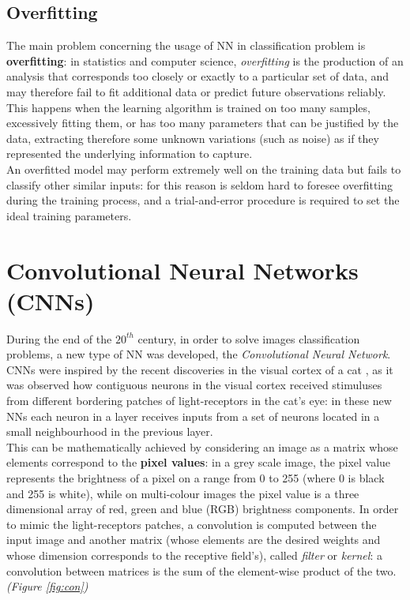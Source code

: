 \documentclass[../main.tex]{subfiles}
\begin{document}
\subsection{Overfitting}
The main problem concerning the usage of NN in classification problem is \textbf{overfitting}: in statistics and computer science, \textit{overfitting} is the production of an analysis that corresponds too closely or exactly to a particular set of data, and may therefore fail to fit additional data or predict future observations reliably.  \\ 
This happens when the learning algorithm is trained on too many samples, excessively fitting them, or has too many parameters that can be justified by the data, extracting therefore some unknown variations (such as noise) as if they represented the underlying information to capture. \\
An overfitted model may perform extremely well on the training data but fails to classify other similar inputs: for this reason is seldom hard to foresee overfitting during the training process, and a trial-and-error procedure is required to set the ideal training parameters.  

\vspace{5mm}
\section{Convolutional Neural Networks (CNNs)}
During the end of the $20^{th}$ century, in order to solve images classification problems, a new type of NN was developed, the \textit{Convolutional Neural Network}. \\
CNNs were inspired by the recent discoveries in the visual cortex of a cat \cite{Hubel1962}, as it was observed how contiguous neurons in the visual cortex received stimuluses from different bordering patches of light-receptors in the cat's eye: in these new NNs each neuron in a layer receives inputs from a set of neurons located in a small neighbourhood in the previous layer.  \\
This can be mathematically achieved by considering an image as a matrix whose elements correspond to the \textbf{pixel values}: in a grey scale image, the pixel value represents the brightness of a pixel on a range from 0 to 255 (where 0 is black and 255 is white), while on multi-colour images the pixel value is a three dimensional array of red, green and blue (RGB) brightness components.  
In order to mimic the light-receptors patches, a convolution is computed between the input image and another matrix (whose elements are the desired weights and whose dimension corresponds to the receptive field's), called \textit{filter} or \textit{kernel}: a convolution between matrices is the sum of the element-wise product of the two.  \textit{(Figure \ref{fig:con})} \\
\end{document}
